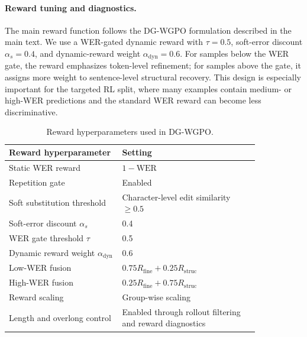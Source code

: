 \documentclass{article}
\begin{document}
\paragraph{Reward tuning and diagnostics.}
The main reward function follows the DG-WGPO formulation described in the main
text. We use a WER-gated dynamic reward with $\tau=0.5$, soft-error discount
$\alpha_s=0.4$, and dynamic-reward weight $\alpha_{\mathrm{dyn}}=0.6$. For samples
below the WER gate, the reward emphasizes token-level refinement; for samples
above the gate, it assigns more weight to sentence-level structural recovery.
This design is especially important for the targeted RL split, where many
examples contain medium- or high-WER predictions and the standard WER reward can
become less discriminative.

\begin{table}[t]
\centering
\small
\caption{
Reward hyperparameters used in DG-WGPO.
}
\label{tab:dg_wgpo_reward_hparams}
\begin{tabular}{p{0.38\linewidth} p{0.46\linewidth}}
\toprule
\textbf{Reward hyperparameter} & \textbf{Setting} \\
\midrule
Static WER reward
& $1-\mathrm{WER}$ \\

Repetition gate
& Enabled \\

Soft substitution threshold
& Character-level edit similarity $\geq 0.5$ \\

Soft-error discount $\alpha_s$
& 0.4 \\

WER gate threshold $\tau$
& 0.5 \\

Dynamic reward weight $\alpha_{\mathrm{dyn}}$
& 0.6 \\

Low-WER fusion
& $0.75 R_{\mathrm{fine}} + 0.25 R_{\mathrm{struc}}$ \\

High-WER fusion
& $0.25 R_{\mathrm{fine}} + 0.75 R_{\mathrm{struc}}$ \\

Reward scaling
& Group-wise scaling \\

Length and overlong control
& Enabled through rollout filtering and reward diagnostics \\
\bottomrule
\end{tabular}
\vspace{-2mm}
\end{table}
\end{document}
